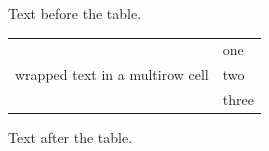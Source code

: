 \documentclass[12pt]{article}
\begin{document}
Text before the table.

\begin{tabular}{|l|l|}\hline \multirow{3}{2cm}{wrapped text in a multirow cell} & one\\ & two\\ & three\\\hline\end{tabular}

Text after the table.
\end{document}

